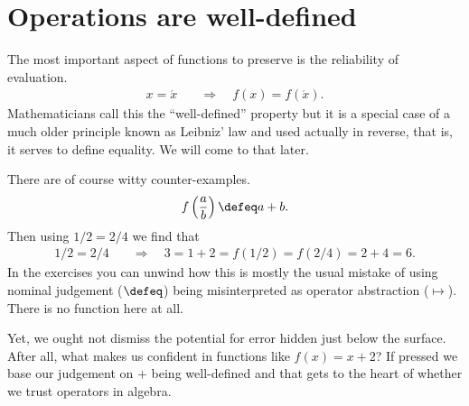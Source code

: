 
\section{Operations are well-defined}
The most important aspect of functions to preserve is the reliability of evaluation.
\begin{align*}
    \tag{Well-defined}
    x=\acute{x} & \quad\Rightarrow\quad f(x)=f(\acute{x}).
\end{align*}
Mathematicians call this the ``well-defined'' property but it 
is a special case of a much older principle known as Leibniz' law 
and used actually in reverse, that is, it serves to define equality.
We will come to that later.

There are of course witty counter-examples.
\begin{align*}
    f\left(\frac{a}{b}\right)\defeq a+b.
\end{align*}
Then using $1/2=2/4$ we find that
\begin{align*}
    1/2 = 2/4 & \quad \Rightarrow\quad 3=1+2=f(1/2)=f(2/4)=2+4=6.
\end{align*}
In the exercises you can unwind how this is mostly the 
usual mistake of using nominal judgement ($\defeq$) 
being misinterpreted as operator abstraction ($\mapsto$).
There is no function here at all.

Yet, we ought not dismiss the potential for error hidden 
just below the surface.  After all, what makes us 
confident in functions like $f(x)=x+2$?  If pressed we 
base our judgement on $+$ being well-defined and that 
gets to the heart of whether we trust operators in algebra.



